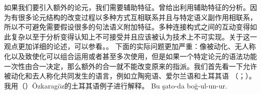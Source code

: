 \noindent
如果我们要引入额外的论元，我们需要辅助特征。\citet{Koenig99a}曾给出利用辅助特征的分析。因为有很多论元结构的改变过程以多种方式互相联系并且与特定语义副作用相联系，所以不可避免需要假设很多的句法语义附加特征。多种连接构式之间的互动变得如此复杂以至于分析变得认知上不可接受并且应该被认为技术上不可实现。关于这一观点更加详细的论述，可以参看。。
下面的实际问题更加严重：像被动化、无人称化以及致使化可以组合运用或者甚至多次使用，但是如果一个特定论元的语法功能一次性由合一决定，那么额外的合一就不能改变原来的指派。我们首先看一下允许被动化和去人称化共同发生的语言，例如立陶宛语\citep[\S~5]{Timberlake82a}、爱尔兰语\citep{Noonan94a}和土耳其语 （\citealp{Ozkaragoez86a}；\citealp[\S~2.3.3]{Knecht85a-u}）。我用（）Özkaragöz的土耳其语例子进行解释\citeyearpar[]{Ozkaragoez86a}。
\eal\label{ex-double-passivization}
\ex\label{ex-double-passivization-strangle}
\gll Bu şato-da boğ-ul-un-ur.\\
